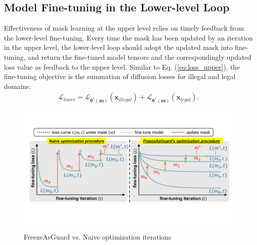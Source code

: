 \documentclass{article}
\begin{document}
\subsection{Model Fine-tuning in the Lower-level Loop}
\vspace{-0.05in}
Effectiveness of mask learning at the upper level relies on timely feedback from the lower-level fine-tuning. Every time the mask has been updated by an iteration in the upper level, the lower-level loop should adopt the updated mask into fine-tuning, and return the fine-tuned model tensors and the correspondingly updated loss value as feedback to the upper level. Similar to Eq. (\ref{eq:loss_upper}), the fine-tuning objective is the summation of diffusion losses for illegal and legal domains:
\begin{align}
	\mathcal{L}_{lower} = \mathcal{L}_{\boldsymbol{\theta}^{*}(\mathbf{m})}(\mathbf{x}_{illegal}) + 
	\mathcal{L}_{\boldsymbol{\theta}^{*}(\mathbf{m})}(\mathbf{x}_{legal}).
	\label{eq:loss_lower}
\end{align}


\begin{figure}[ht]
	\centering
	\includegraphics[width=\linewidth]{figures/loss_illustration.pdf}
	\caption{FreezeAsGuard vs. Naive optimization iterations}
	\label{fig:loss_illustration}
	\vspace{-0.1in}
\end{figure}

\end{document}
